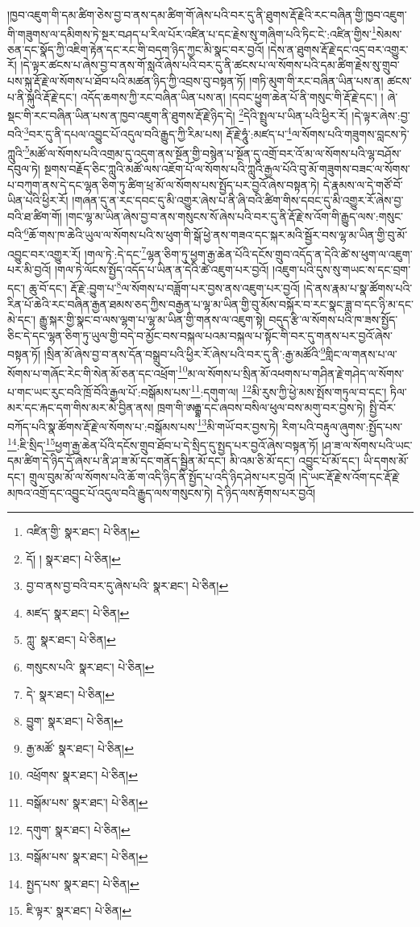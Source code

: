 །ཁྱབ་འཇུག་གི་དམ་ཚིག་ཅེས་བྱ་བ་ནས་དམ་ཚིག་གོ་ཞེས་པའི་བར་དུ་ནི་ཐུགས་རྡོ་རྗེའི་རང་བཞིན་གྱི་ཁྱབ་འཇུག་གི་གཟུགས་ལ་དམིགས་ཏེ་སྔར་བཤད་པ་རིལ་པོར་འཛིན་པ་དང་རྗེས་སུ་གཞིག་པའི་ཏིང་ངེ་:འཛིན་གྱིས་\footnote{འཛིན་གྱི་  སྣར་ཐང་།  པེ་ཅིན། }སེམས་ཅན་དང་སྣོད་ཀྱི་འཇིག་རྟེན་དང་རང་གི་བདག་ཉིད་ཀྱང་མི་སྣང་བར་བྱའོ། །དེས་ན་ཐུགས་རྡོ་རྗེ་དང་འདྲ་བར་འགྱུར་རོ། །དེ་ལྟར་ཚངས་པ་ཞེས་བྱ་བ་ནས་གོ་སླའོ་ཞེས་པའི་བར་དུ་ནི་ཚངས་པ་ལ་སོགས་པའི་དམ་ཚིག་རྗེས་སུ་གྲུབ་པས་སྐུ་རྡོ་རྗེ་ལ་སོགས་པ་ཐོབ་པའི་མཚན་ཉིད་ཀྱི་འབྲས་བུ་བསྟན་ཏོ། །གཏི་མུག་གི་རང་བཞིན་ཡིན་པས་ན། ཚངས་པ་ནི་སྐུའི་རྡོ་རྗེ་དང་། འདོད་ཆགས་ཀྱི་རང་བཞིན་ཡིན་པས་ན། །དབང་ཕྱུག་ཆེན་པོ་ནི་གསུང་གི་རྡོ་རྗེ་དང་། །
ཞེ་སྡང་གི་རང་བཞིན་ཡིན་པས་ན་ཁྱབ་འཇུག་ནི་ཐུགས་རྡོ་རྗེ་ཉིད་དེ། \footnote{དོ། །   སྣར་ཐང་།  པེ་ཅིན། }དེའི་སྤྲུལ་པ་ཡིན་པའི་ཕྱིར་རོ། །དེ་ལྟར་ཞེས་:བྱ་བའི་\footnote{བྱ་བ་ནས་བྱ་བའི་བར་དུ་ཞེས་པའི་  སྣར་ཐང་།  པེ་ཅིན། }བར་དུ་ནི་དཔལ་འབྱུང་པོ་འདུལ་བའི་རྒྱུད་ཀྱི་རིམ་པས། རྡོ་རྗེ་ཧཱུཾ་:མཛད་པ་\footnote{མཛད་  སྣར་ཐང་།  པེ་ཅིན། }ལ་སོགས་པའི་གཟུགས་བླངས་ཏེ་ཀླུའི་\footnote{ཀླུ་  སྣར་ཐང་།  པེ་ཅིན། }མཚོ་ལ་སོགས་པའི་འགྲམ་དུ་འདུག་ནས་སྔོན་གྱི་བསྙེན་པ་སྔོན་དུ་འགྲོ་བར་འོ་མ་ལ་སོགས་པའི་ལྷ་བཤོས་དབུལ་ཏེ། སྔགས་བརྗོད་ཅིང་ཀླུའི་མཚོ་ལས་འཇོག་པོ་ལ་སོགས་པའི་ཀླུའི་རྒྱལ་པོའི་བུ་མོ་གཟུགས་བཟང་ལ་སོགས་པ་བཀུག་ནས་དེ་དང་ལྷན་ཅིག་ཏུ་ཚིག་ཕྲ་མོ་ལ་སོགས་པས་སྤྱོད་པར་བྱའོ་ཞེས་བསྟན་ཏེ། དེ་རྣམས་ལ་དེ་གཙོ་བོ་ཡིན་པའི་ཕྱིར་རོ། །གཞན་དུ་ན་རང་དབང་དུ་མི་འགྱུར་ཞེས་པ་ནི་ཞི་བའི་ཚིག་གིས་དབང་དུ་མི་འགྱུར་རོ་ཞེས་བྱ་བའི་ཐ་ཚིག་གོ། །གང་ལྷ་མ་ཡིན་ཞེས་བྱ་བ་ནས་གསུངས་སོ་ཞེས་པའི་བར་དུ་ནི་རྡོ་རྗེ་ས་འོག་གི་རྒྱུད་ལས་:གསུང་བའི་\footnote{གསུངས་པའི་  སྣར་ཐང་།  པེ་ཅིན། }ཆོ་གས་ཁ་ཆེའི་ཡུལ་ལ་སོགས་པའི་ས་ཕུག་གི་སྒོ་ཕྱེ་ནས་གཟའ་དང་སྐར་མའི་སྦྱོར་བས་ལྷ་མ་ཡིན་གྱི་བུ་མོ་འབྱུང་བར་འགྱུར་རོ། །གལ་ཏེ་:དེ་དང་\footnote{དེ་  སྣར་ཐང་།  པེ་ཅིན། }ལྷན་ཅིག་ཏུ་ཕྱག་རྒྱ་ཆེན་པོའི་དངོས་གྲུབ་འདོད་ན་དེའི་ཚེ་ས་ཕུག་ལ་འཇུག་པར་མི་བྱའོ། །གལ་ཏེ་ལོངས་སྤྱོད་འདོད་པ་ཡིན་ན་དེའི་ཚེ་འཇུག་པར་བྱའོ། །འཇུག་པའི་དུས་སུ་གཡང་ས་དང་བྲག་དང་། ཆུ་བོ་དང་། རྡོ་རྗེ་:བྱུག་པ་\footnote{བྱུག་  སྣར་ཐང་།  པེ་ཅིན། }ལ་སོགས་པ་བཟློག་པར་བྱས་ནས་འཇུག་པར་བྱའོ། །དེ་ནས་རྣམ་པ་སྣ་ཚོགས་པའི་རིན་པོ་ཆེའི་རང་བཞིན་རྒྱན་ཐམས་ཅད་ཀྱིས་བརྒྱན་པ་ལྷ་མ་ཡིན་གྱི་བུ་མོས་བསྐོར་བ་རང་སྣང་ཟླ་བ་དང་ཉི་མ་དང་མེ་དང་། རྒྱུ་སྐར་གྱི་སྣང་བ་ལས་ལྷག་པ་ལྷ་མ་ཡིན་གྱི་གནས་ལ་འཇུག་སྟེ། བདུད་རྩི་ལ་སོགས་པའི་ཁ་ཟས་སྤྱོད་ཅིང་དེ་དང་ལྷན་ཅིག་ཏུ་ཡུལ་གྱི་བདེ་བ་མྱོང་བས་བསྐལ་པའམ་བསྐལ་པ་སྟོང་གི་བར་དུ་གནས་པར་བྱའོ་ཞེས་བསྟན་ཏོ། །སྲིན་མོ་ཞེས་བྱ་བ་ནས་དོན་བསྒྲུབ་པའི་ཕྱིར་རོ་ཞེས་པའི་བར་དུ་ནི་:རྒྱ་མཚོའི་\footnote{རྒྱ་མཚོ་  སྣར་ཐང་།  པེ་ཅིན། }གླིང་ལ་གནས་པ་ལ་སོགས་པ་གཞོང་རེང་གི་སེན་མོ་ཅན་དང་འཕྲོག་\footnote{འཕྲོགས་  སྣར་ཐང་།  པེ་ཅིན། }མ་ལ་སོགས་པ་སྲིན་མོ་འཕགས་པ་གཤིན་རྗེ་གཤེད་ལ་སོགས་པ་གང་ཡང་རུང་བའི་ཁྲོ་བོའི་རྒྱལ་པོ་:བསྒོམས་པས་\footnote{བསྒོམ་པས་  སྣར་ཐང་།  པེ་ཅིན། }:དགུག་ལ། \footnote{དགུག་  སྣར་ཐང་།  པེ་ཅིན། }མི་རུས་ཀྱི་ཕྱེ་མས་སྤོས་གཏུལ་བ་དང་། ཏིལ་མར་དང་རྐང་དག་གིས་མར་མེ་བྱིན་ནས། ཁྲག་གི་ཨརྒྷ་དང་ཞབས་བསིལ་ཕུལ་བས་མགུ་བར་བྱས་ཏེ། སྤྱི་བོར་བཀོད་པའི་སྣ་ཚོགས་རྡོ་རྗེ་ལ་སོགས་པ་:བསྒོམས་པས་\footnote{བསྒོམ་པས་  སྣར་ཐང་།  པེ་ཅིན། }མི་གཡོ་བར་བྱས་ཏེ། རིག་པའི་བརྟུལ་ཞུགས་:སྤྱོད་པས་\footnote{སྤྱད་པས་  སྣར་ཐང་།  པེ་ཅིན། }:ཇི་སྲིད་\footnote{ཇི་ལྟར་  སྣར་ཐང་།  པེ་ཅིན། }ཕྱག་རྒྱ་ཆེན་པོའི་དངོས་གྲུབ་ཐོབ་པ་དེ་སྲིད་དུ་སྤྱད་པར་བྱའོ་ཞེས་བསྟན་ཏོ། །ཤ་ཟ་ལ་སོགས་པའི་ཡང་དམ་ཚིག་དེ་ཉིད་དོ་ཞེས་པ་ནི་ཤ་ཟ་མོ་དང་གནོད་སྦྱིན་མོ་དང་། མི་འམ་ཅི་མོ་དང་། འབྱུང་པོ་མོ་དང་། ཡི་དགས་མོ་དང་། གྲུལ་བུམ་མོ་ལ་སོགས་པའི་ཆོ་ག་འདི་ཉིད་ནི་སྤྱོད་པ་འདི་ཉིད་ཤེས་པར་བྱའོ། །དེ་ཡང་རྡོ་རྗེ་ས་འོག་དང་རྡོ་རྗེ་མཁའ་འགྲོ་དང་འབྱུང་པོ་འདུལ་བའི་རྒྱུད་ལས་གསུངས་ཏེ། དེ་ཉིད་ལས་རྟོགས་པར་བྱའོ། 
